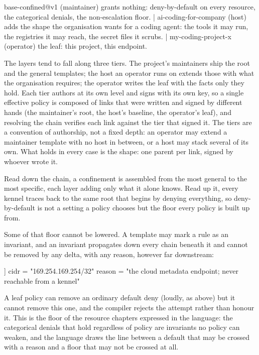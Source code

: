 \begin{kennelcode}
base-confined@v1          (maintainer) grants nothing: deny-by-default on every
                          resource, the categorical denials, the non-escalation floor.
  |
ai-coding-for-company     (host) adds the shape the organisation wants for a coding
                          agent: the tools it may run, the registries it may reach,
                          the secret files it scrubs.
  |
my-coding-project-x       (operator) the leaf: this project, this endpoint.
\end{kennelcode}

The layers tend to fall along three tiers. The project's maintainers
ship the root and the general templates; the host an operator runs on
extends those with what the organisation requires; the operator writes
the leaf with the facts only they hold. Each tier authors at its own
level and signs with its own key, so a single effective policy is
composed of links that were written and signed by different hands (the
maintainer's root, the host's baseline, the operator's leaf), and
resolving the chain verifies each link against the tier that signed it.
The tiers are a convention of authorship, not a fixed depth: an operator
may extend a maintainer template with no host in between, or a host may
stack several of its own. What holds in every case is the shape: one
parent per link, signed by whoever wrote it.

Read down the chain, a confinement is assembled from the most general to
the most specific, each layer adding only what it alone knows. Read up
it, every kennel traces back to the same root that begins by denying
everything, so deny-by-default is not a setting a policy chooses but the
floor every policy is built up from.

Some of that floor cannot be lowered. A template may mark a rule as an
invariant, and an invariant propagates down every chain beneath it and
cannot be removed by any delta, with any reason, however far downstream:

\begin{kennelcode}
[[net.deny.invariant]]
cidr = "169.254.169.254/32"
reason = "the cloud metadata endpoint; never reachable from a kennel"
\end{kennelcode}

A leaf policy can remove an ordinary default deny (loudly, as above) but
it cannot remove this one, and the compiler rejects the attempt rather
than honour it. This is the floor of the resource chapters expressed in
the language: the categorical denials that hold regardless of policy are
invariants no policy can weaken, and the language draws the line between
a default that may be crossed with a reason and a floor that may not be
crossed at all.

